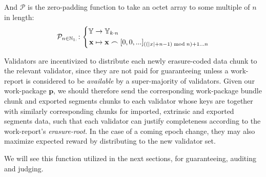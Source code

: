 And $\mathcal{P}$ is the zero-padding function to take an octet array to some multiple of $n$ in length:
\begin{equation}\label{eq:zeropadding}
  \mathcal{P}_{n \in \N_{1:}}\colon\left\{\begin{aligned}
    \Y &\to \Y_{k\cdot n}\\
    \mathbf{x} &\mapsto \mathbf{x} \concat [0, 0, ...]_{((|x|+n - 1) \bmod n) + 1 \dots n}
  \end{aligned}\right.
\end{equation}

Validators are incentivized to distribute each newly erasure-coded data chunk to the relevant validator, since they are not paid for guaranteeing unless a work-report is considered to be \emph{available} by a super-majority of validators. Given our work-package $\mathbf{p}$, we should therefore send the corresponding work-package bundle chunk and exported segments chunks to each validator whose keys are together with similarly corresponding chunks for imported, extrinsic and exported segments data, such that each validator can justify completeness according to the work-report's \emph{erasure-root}. In the case of a coming epoch change, they may also maximize expected reward by distributing to the new validator set.

We will see this function utilized in the next sections, for guaranteeing, auditing and judging.
